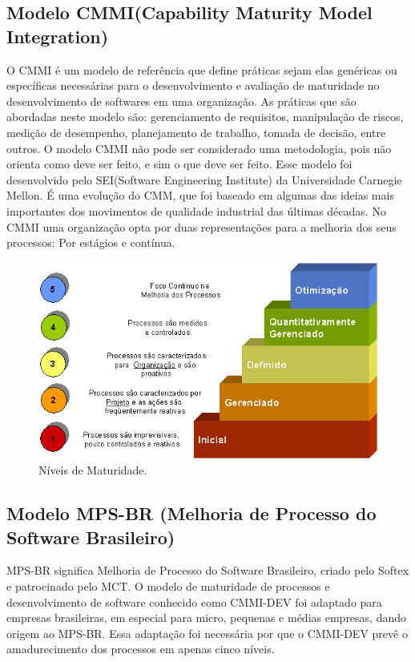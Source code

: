   \subsection{Modelo CMMI(Capability Maturity Model Integration)}
  O CMMI é um modelo de referência que define práticas sejam elas genéricas ou específicas necessárias para o desenvolvimento e avaliação de maturidade no desenvolvimento de softwares em uma organização. As práticas que são abordadas neste modelo são: gerenciamento de requisitos, manipulação de riscos, medição de desempenho, planejamento de trabalho, tomada de decisão, entre outros. O modelo CMMI não pode ser considerado uma metodologia, pois não orienta como deve ser feito, e sim o que deve ser feito. Esse modelo foi desenvolvido pelo SEI(Software Engineering Institute) da Universidade Carnegie Mellon. É uma evolução do CMM, que foi baseado em algumas das ideias mais importantes dos movimentos de qualidade industrial das últimas décadas.
No CMMI uma organização opta por duas representações para a melhoria dos seus processos: Por estágios e contínua.\cite{modelosmaturidade}
  \begin{figure}[!htbp]
    \centering
    \includegraphics[scale=0.5]{figuras/cinco-niveis-maturidade-cmmi}
    \caption[Níveis de Maturidade]{Níveis de Maturidade. \footnotemark}
    \label{cinco-niveis-maturidade-cmmi}
  \end{figure}

  \subsection{Modelo MPS-BR (Melhoria de Processo do Software Brasileiro)} \label{mps-br}
MPS-BR significa Melhoria de Processo do Software Brasileiro, criado pelo Softex e patrocinado pelo MCT. O modelo de maturidade de processos e desenvolvimento de software conhecido como CMMI-DEV foi adaptado para empresas brasileiras, em especial para micro, pequenas e médias empresas, dando origem ao MPS-BR. Essa adaptação foi necessária por que o CMMI-DEV prevê o amadurecimento dos processos em apenas cinco níveis.\cite{modelosmaturidade}

